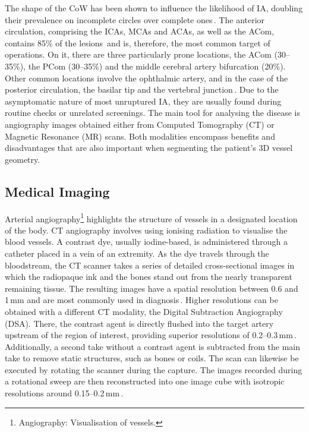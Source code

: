 The shape of the CoW has been shown to influence the likelihood of IA, doubling their prevalence on incomplete circles over complete ones\,\cite{Hindenes2023}. The anterior circulation, comprising the ICAs, MCAs and ACAs, as well as the ACom, contains 85\% of the lesions\,\cite{Brown2014} and is, therefore, the most common target of operations. On it, there are three particularly prone locations, the ACom (30--35\%), the PCom (30--35\%) and the middle cerebral artery bifurcation (20\%). Other common locations involve the ophthalmic artery, and in the case of the posterior circulation, the basilar tip and the vertebral junction\,\cite{Hacein-Bey2011}. Due to the asymptomatic nature of most unruptured IA, they are usually found during routine checks or unrelated screenings. The main tool for analysing the disease is angiography images obtained either from Computed Tomography (CT) or Magnetic Resonance (MR) scans. Both modalities encompass benefits and disadvantages that are also important when segmenting the patient's 3D vessel geometry.

\subsection{Medical Imaging}\label{chap3:sec1:subsec2}
Arterial angiography\footnote{Angiography: Visualisation of vessels.} highlights the structure of vessels in a designated location of the body. CT angiography involves using ionising radiation to visualise the blood vessels. A contrast dye, usually iodine-based, is administered through a catheter placed in a vein of an extremity. As the dye travels through the bloodstream, the CT scanner takes a series of detailed cross-sectional images in which the radiopaque ink and the bones stand out from the nearly transparent remaining tissue. The resulting images have a spatial resolution between 0.6 and 1\,mm and are most commonly used in diagnosis\,\cite{Hacein-Bey2011}. Higher resolutions can be obtained with a different CT modality, the Digital Subtraction Angiography (DSA). There, the contrast agent is directly flushed into the target artery upstream of the region of interest, providing superior resolutions of 0.2--0.3\,mm\,\cite{Hacein-Bey2011}. Additionally, a second take without a contrast agent is subtracted from the main take to remove static structures, such as bones or coils. The scan can likewise be executed by rotating the scanner during the capture. The images recorded during a rotational sweep are then reconstructed into one image cube with isotropic resolutions around 0.15--0.2\,mm\,\cite{Hacein-Bey2011}.

